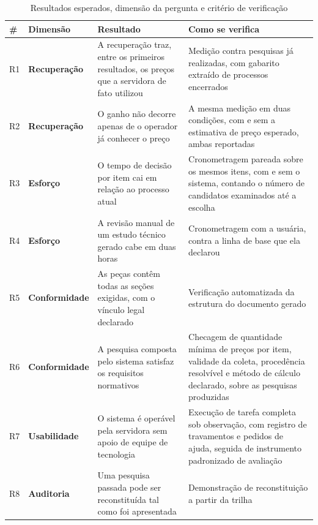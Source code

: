 \begin{table}[H]
  \centering
  \caption{Resultados esperados, dimensão da pergunta e critério de verificação}
  \label{tab:resultados-esperados}
  \begin{ufopaespacosimples}
  \footnotesize
  \begin{tabularx}{\textwidth}{@{}llXX@{}}
    \toprule
    \textbf{\#} & \textbf{Dimensão} & \textbf{Resultado} &
      \textbf{Como se verifica} \\
    \midrule
    R1 & \textbf{Recuperação} & A recuperação traz, entre os primeiros resultados, os
      preços que a servidora de fato utilizou & Medição contra pesquisas já
      realizadas, com gabarito extraído de processos encerrados \\
    R2 & \textbf{Recuperação} & O ganho não decorre apenas de o operador já conhecer o
      preço & A mesma medição em duas condições, com e sem a estimativa de preço
      esperado, ambas reportadas \\
    R3 & \textbf{Esforço} & O tempo de decisão por item cai em relação ao
      processo atual & Cronometragem pareada sobre os mesmos itens, com e sem o
      sistema, contando o número de candidatos examinados até a escolha \\
    R4 & \textbf{Esforço} & A revisão manual de um estudo técnico gerado cabe em
      duas horas & Cronometragem com a usuária, contra a linha de base que ela
      declarou \\
    R5 & \textbf{Conformidade} & As peças contêm todas as seções exigidas, com o
      vínculo legal declarado & Verificação automatizada da estrutura do
      documento gerado \\
    R6 & \textbf{Conformidade} & A pesquisa composta pelo sistema satisfaz os
      requisitos normativos & Checagem de quantidade mínima de preços por item,
      validade da coleta, procedência resolvível e método de cálculo declarado,
      sobre as pesquisas produzidas \\
    R7 & \textbf{Usabilidade} & O sistema é operável pela servidora sem apoio de
      equipe de tecnologia & Execução de tarefa completa sob observação, com
      registro de travamentos e pedidos de ajuda, seguida de instrumento
      padronizado de avaliação \\
    R8 & \textbf{Auditoria} & Uma pesquisa passada pode ser reconstituída tal como foi
      apresentada & Demonstração de reconstituição a partir da trilha \\
    \bottomrule
  \end{tabularx}
  \end{ufopaespacosimples}
\end{table}

